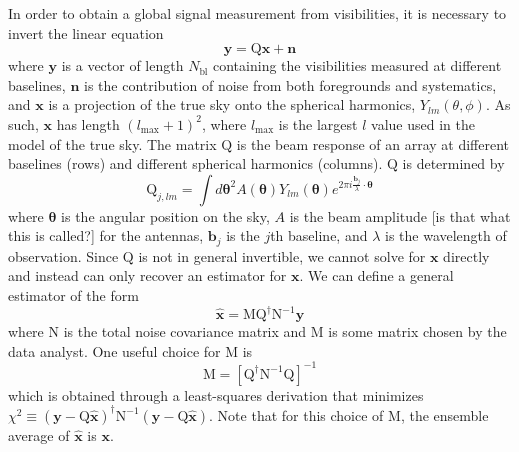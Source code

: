 \documentclass[twolcolumn,apj]{emulateapj}
\begin{document}
In order to obtain a global signal measurement from visibilities, it is necessary to invert the linear equation 
\begin{equation}
\mathbf{y} = \textrm{Q} \mathbf{x} + \mathbf{n}
\end{equation}
where $\mathbf{y}$ is a vector of length $N_{\textrm{bl}}$ containing the visibilities measured at different baselines, $\mathbf{n}$ is the contribution of noise from both foregrounds and systematics, and $\mathbf{x}$ is a projection of the true sky onto the spherical harmonics, $Y_{lm}(\theta,\phi)$. As such, $\mathbf{x}$ has length $(l_{\textrm{max}}+1)^2$, where $l_{\textrm{max}}$ is the largest $l$ value used in the model of the true sky. The matrix $\textrm{Q}$ is the beam response of an array at different baselines (rows) and different spherical harmonics (columns). $\textrm{Q}$ is determined by 
\begin{equation}
\textrm{Q}_{j,lm} = \int d \boldsymbol \theta^2 A(\boldsymbol \theta) Y_{lm}(\boldsymbol \theta) e^{2\pi i \frac{\mathbf{b_\textit{j}}}{\lambda} \cdot \boldsymbol \theta}
\end{equation}
where $\boldsymbol \theta$ is the angular position on the sky, $A$ is the beam amplitude [is that what this is called?] for the antennas, $\mathbf{b_{\textit{j}}}$ is the $j$th baseline, and $\lambda$ is the wavelength of observation. Since $\textrm{Q}$ is not in general invertible, we cannot solve for $\mathbf{x}$ directly and instead can only recover an estimator for $\mathbf{x}$. We can define a general estimator of the form 
\begin{equation}
\mathbf{\hat x} = \textrm{M} \textrm{Q}^\dagger \textrm{N}^{-1} \mathbf{y}
\end{equation}
where N is the total noise covariance matrix and M is some matrix chosen by the data analyst. One useful choice for M is 
\begin{equation}
\textrm{M} = [\textrm{Q}^\dagger \textrm{N}^{-1} \textrm{Q}]^{-1}
\end{equation}
which is obtained through a least-squares derivation that minimizes $\chi^2 \equiv (\mathbf{y}-\textrm{Q} \mathbf{\hat x})^\dagger \textrm{N}^{-1} (\mathbf{y}-\textrm{Q} \mathbf{\hat x})$. Note that for this choice of M, the ensemble average of $\mathbf{\hat x}$ is $\mathbf{x}$.
\end{document}
